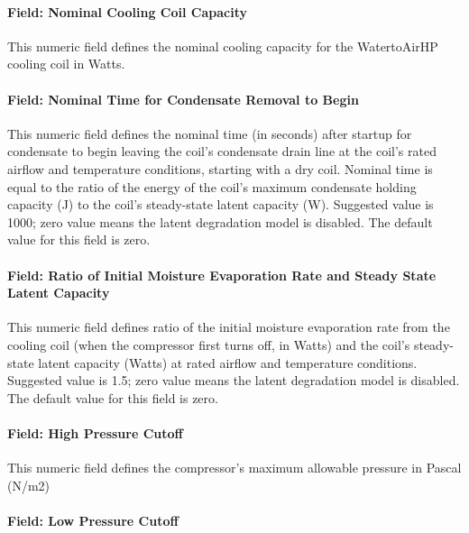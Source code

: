 \paragraph{Field: Nominal Cooling Coil Capacity}\label{field-nominal-cooling-coil-capacity}

This numeric field defines the nominal cooling capacity for the WatertoAirHP cooling coil in Watts.

\paragraph{Field: Nominal Time for Condensate Removal to Begin}\label{field-nominal-time-for-condensate-removal-to-begin-3}

This numeric field defines the nominal time (in seconds) after startup for condensate to begin leaving the coil's condensate drain line at the coil's rated airflow and temperature conditions, starting with a dry coil. Nominal time is equal to the ratio of the energy of the coil's maximum condensate holding capacity (J) to the coil's steady-state latent capacity (W). Suggested value is 1000; zero value means the latent degradation model is disabled. The default value for this field is zero.

\paragraph{Field: Ratio of Initial Moisture Evaporation Rate and Steady State Latent Capacity}\label{field-ratio-of-initial-moisture-evaporation-rate-and-steady-state-latent-capacity-3}

This numeric field defines ratio of the initial moisture evaporation rate from the cooling coil (when the compressor first turns off, in Watts) and the coil's steady-state latent capacity (Watts) at rated airflow and temperature conditions. Suggested value is 1.5; zero value means the latent degradation model is disabled. The default value for this field is zero.

\paragraph{Field: High Pressure Cutoff}\label{field-high-pressure-cutoff}

This numeric field defines the compressor's maximum allowable pressure in Pascal (N/m2)

\paragraph{Field: Low Pressure Cutoff}\label{field-low-pressure-cutoff}

